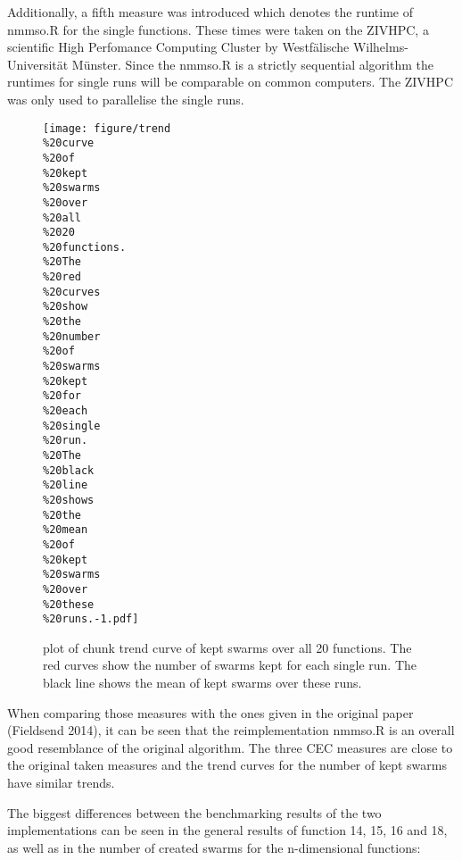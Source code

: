 \documentclass[12pt,a4paper]{article}
\begin{document}
Additionally, a fifth measure was introduced which denotes the runtime
of nmmso.R for the single functions. These times were taken on the
ZIVHPC, a scientific High Perfomance Computing Cluster by Westfälische
Wilhelms-Universität Münster. Since the nmmso.R is a strictly sequential
algorithm the runtimes for single runs will be comparable on common
computers. The ZIVHPC was only used to parallelise the single runs.

\begin{figure}[htbp]
\centering
\texttt{[image: figure/trend\\\%20curve\\\%20of\\\%20kept\\\%20swarms\\\%20over\\\%20all\\\%2020\\\%20functions.\\\%20The\\\%20red\\\%20curves\\\%20show\\\%20the\\\%20number\\\%20of\\\%20swarms\\\%20kept\\\%20for\\\%20each\\\%20single\\\%20run.\\\%20The\\\%20black\\\%20line\\\%20shows\\\%20the\\\%20mean\\\%20of\\\%20kept\\\%20swarms\\\%20over\\\%20these\\\%20runs.-1.pdf]}
\caption{plot of chunk trend curve of kept swarms over all 20 functions.
The red curves show the number of swarms kept for each single run. The
black line shows the mean of kept swarms over these runs.}
\end{figure}

When comparing those measures with the ones given in the original paper
(Fieldsend 2014), it can be seen that the reimplementation nmmso.R is an
overall good resemblance of the original algorithm. The three CEC
measures are close to the original taken measures and the trend curves
for the number of kept swarms have similar trends.

The biggest differences between the benchmarking results of the two
implementations can be seen in the general results of function 14, 15,
16 and 18, as well as in the number of created swarms for the
n-dimensional functions:
\end{document}
